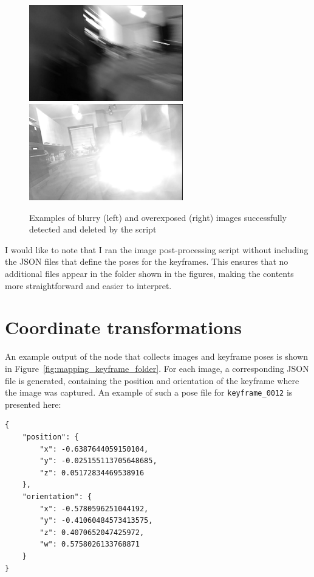 \begin{figure}[htbp]
	\centering
	\includegraphics[width=67mm, keepaspectratio]{figures_jpg/example_for_blurry.jpg}\hspace{1cm}
	\includegraphics[width=67mm, keepaspectratio]{figures_jpg/example_for_overexposed.jpg}\\\vspace{5mm}
	\caption{Examples of blurry (left) and overexposed (right) images successfully detected and deleted by the script}
	\label{fig:blurry_overexposed_example}
\end{figure}
\FloatBarrier

I would like to note that I ran the image post-processing script without including the JSON files that define the poses for the keyframes. This ensures that no additional files appear in the folder shown in the figures, making the contents more straightforward and easier to interpret.

\section{Coordinate transformations}

An example output of the node that collects images and keyframe poses is shown in Figure~\ref{fig:mapping_keyframe_folder}. For each image, a corresponding JSON file is generated, containing the position and orientation of the keyframe where the image was captured. An example of such a pose file for \verb|keyframe_0012| is presented here:

\begin{verbatim}
{
    "position": {
        "x": -0.6387644059150104,
        "y": -0.025155113705648685,
        "z": 0.05172834469538916
    },
    "orientation": {
        "x": -0.5780596251044192,
        "y": -0.41060484573413575,
        "z": 0.4070652047425972,
        "w": 0.5758026133768871
    }
}
\end{verbatim}

